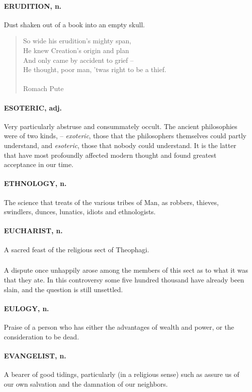 \documentclass[11pt]{article}
\begin{document}
\paragraph{ERUDITION, n.}  Dust shaken out of a book into an empty skull.

\begin{quote}   So wide his erudition's mighty span, \\
  He knew Creation's origin and plan \\
  And only came by accident to grief -- \\
  He thought, poor man, 'twas right to be a thief. \\
 \\
Romach Pute \end{quote}


\paragraph{ESOTERIC, adj.}  Very particularly abstruse and consummately occult.
The ancient philosophies were of two kinds, -- {\em exoteric}, those that
the philosophers themselves could partly understand, and {\em esoteric},
those that nobody could understand.  It is the latter that have most
profoundly affected modern thought and found greatest acceptance in
our time.

\paragraph{ETHNOLOGY, n.}  The science that treats of the various tribes of Man,
as robbers, thieves, swindlers, dunces, lunatics, idiots and
ethnologists.

\paragraph{EUCHARIST, n.}  A sacred feast of the religious sect of Theophagi.
\subparagraph{}   A dispute once unhappily arose among the members of this sect as
to what it was that they ate.  In this controversy some five hundred
thousand have already been slain, and the question is still unsettled.

\paragraph{EULOGY, n.}  Praise of a person who has either the advantages of wealth
and power, or the consideration to be dead.

\paragraph{EVANGELIST, n.}  A bearer of good tidings, particularly (in a religious
sense) such as assure us of our own salvation and the damnation of
our neighbors.
\end{document}
